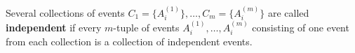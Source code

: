 Several collections of events $C_1 = \{A_i^{(1)}\}, \dots, C_m = \{A_i^{(m)}\}$ are called \textbf{independent} if every $m$-tuple of events $A_i^{(1)}, \dots, A_i^{(m)}$ consisting of one event from each collection is a collection of independent events.
